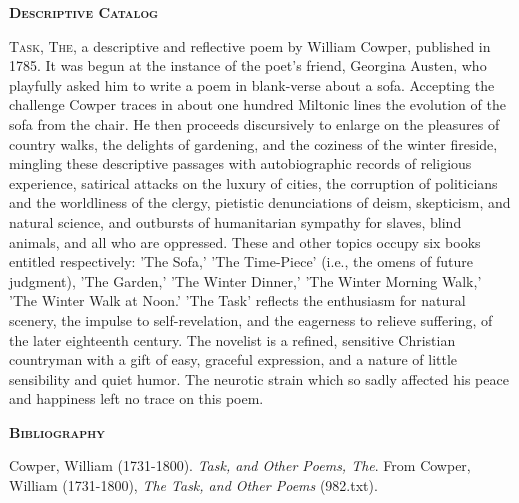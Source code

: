 \documentclass{book}
\begin{document}
{\newpage
\null

\newpage
\null

\newpage
{}
\pagestyle{fancy}
\fancyhf{}
\newpage
\begin{center}
\textbf{\textsc{Descriptive Catalog}}
\end{center}
\fancyfoot[LE,RO]{\thepage}

\par
\textsc{Task}, \textsc{The}, a descriptive and reflective poem by William Cowper, published in 1785. It was begun at the instance of the poet's friend, Georgina Austen, who playfully asked him to write a poem in blank-verse about a sofa. Accepting the challenge Cowper traces in about one hundred Miltonic lines the evolution of the sofa from the chair. He then proceeds discursively to enlarge on the pleasures of country walks, the delights of gardening, and the coziness of the winter fireside, mingling these descriptive passages with autobiographic records of religious experience, satirical attacks on the luxury of cities, the corruption of politicians and the worldliness of the clergy, pietistic denunciations of deism, skepticism, and natural science, and outbursts of humanitarian sympathy for slaves, blind animals, and all who are oppressed. These and other topics occupy six books entitled respectively: 'The Sofa,' 'The Time-Piece' (i.e., the omens of future judgment), 'The Garden,' 'The Winter Dinner,' 'The Winter Morning Walk,' 'The Winter Walk at Noon.' 'The Task' reflects the enthusiasm for natural scenery, the impulse to self-revelation, and the eagerness to relieve suffering, of the later eighteenth century. The novelist is a refined, sensitive Christian countryman with a gift of easy, graceful expression, and a nature of little sensibility and quiet humor. The neurotic strain which so sadly affected his peace and happiness left no trace on this poem.
\vspace{0.25in}
\fancyfoot[LE,RO]{\thepage}
\newpage
\begin{center}
\textbf{\textsc{Bibliography}}
\end{center}
\begin{flushleft}
\parindent=0pt
\hangindent=10mm
\par
Cowper, William (1731-1800).  \textit{Task, and Other Poems, The}.  From Cowper, William (1731-1800), \textit{The Task, and Other Poems} (982.txt).\linebreak
\vspace{-5mm}
\end{flushleft}

}
\end{document}

